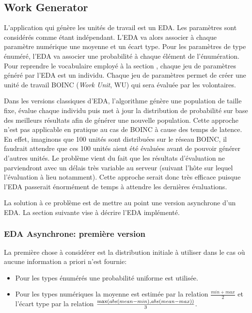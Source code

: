 \documentclass[a4paper, 11pt]{article}
\begin{document}

\subsection{Work Generator}
L'application qui génère les unités de travail est un EDA. Les paramètres sont considérés comme étant indépendant. L'EDA va alors associer à chaque paramètre numérique une moyenne et un écart type. Pour les paramètres de type énuméré, l'EDA va associer une probabilité à chaque élément de l'énumération. Pour reprendre le vocabulaire employé à la section %
, chaque jeu de paramètres généré par l'EDA est un individu. Chaque jeu de paramètres permet de créer une unité de travail \textsc{BOINC} (\textit{Work Unit}, WU) qui sera évaluée par les volontaires. 

Dans les versions classiques d'EDA, %
l'algorithme génère une population de taille fixe, évalue chaque individu puis met à jour la distribution de probabilité sur base des meilleurs résultats afin de générer une nouvelle population. Cette approche n'est pas applicable en pratique au cas de \textsc{BOINC} à cause des temps de latence. En effet, imaginons que 100 unités sont distribuées sur le réseau \textsc{BOINC}, il faudrait attendre que ces 100 unités aient été évaluées avant de pouvoir générer d'autres unités. Le problème vient du fait que les résultats d'évaluation ne parviendront avec un délais très variable au serveur (suivant l'hôte sur lequel l'évaluation à lieu notamment). Cette approche serait donc très efficace puisque l'EDA passerait énormément de temps à attendre les dernières évaluations. 

La solution à ce problème est de mettre au point une version asynchrone d'un EDA. %
La section suivante vise à décrire l'EDA implémenté.

\subsubsection{EDA Asynchrone: première version}
La première chose à considérer est la distribution initiale à utiliser dans le cas où aucune information a priori n'est fournie:
\begin{itemize}
\item Pour les types énumérés une probabilité uniforme est utilisée. %
\item Pour les types numériques la moyenne est estimée par la relation $\frac{min + max}{2}$ et l'écart type par la relation $\frac{\textnormal{max}(abs(mean-min), abs(mean-max))}{3}$.
\end{itemize}
\end{document}
